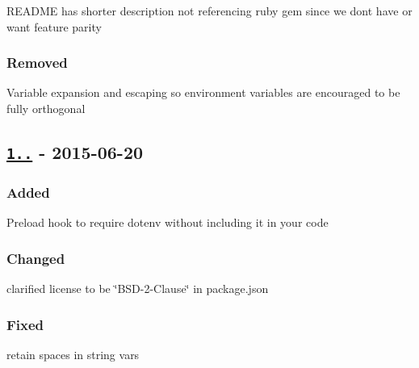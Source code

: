 \begin{DoxyItemize}
\item R\+E\+A\+D\+ME has shorter description not referencing ruby gem since we don\textquotesingle{}t have or want feature parity
\end{DoxyItemize}

\subsubsection*{Removed}


\begin{DoxyItemize}
\item Variable expansion and escaping so environment variables are encouraged to be fully orthogonal
\end{DoxyItemize}

\subsection*{\href{https://github.com/motdotla/dotenv/compare/v1.1.0...v1.2.0}{\tt 1..} -\/ 2015-\/06-\/20}

\subsubsection*{Added}


\begin{DoxyItemize}
\item Preload hook to require dotenv without including it in your code
\end{DoxyItemize}

\subsubsection*{Changed}


\begin{DoxyItemize}
\item clarified license to be \char`\"{}\+B\+S\+D-\/2-\/\+Clause\char`\"{} in {\ttfamily package.\+json}
\end{DoxyItemize}

\subsubsection*{Fixed}


\begin{DoxyItemize}
\item retain spaces in string vars
\end{DoxyItemize}

